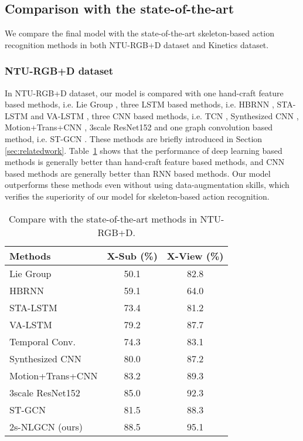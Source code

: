 \documentclass[10pt,twocolumn,letterpaper]{article}
\begin{document}
    
    \subsection{Comparison with the state-of-the-art}
    
    We compare the final model with the state-of-the-art skeleton-based action recognition methods in both NTU-RGB+D dataset and Kinetics dataset. 
    \subsubsection{NTU-RGB+D dataset}
    In NTU-RGB+D dataset, our model is compared with one hand-craft feature based methods, i.e. Lie Group \cite{vemulapalli_human_2014}, three LSTM based methods, i.e. HBRNN \cite{du_hierarchical_2015}, STA-LSTM \cite{song_end--end_2017} and VA-LSTM \cite{zhang_view_2017}, three CNN based methods, i.e. TCN \cite{kim_interpretable_2017}, Synthesized CNN \cite{liu_enhanced_2017}, Motion+Trans+CNN \cite{li_skeleton-based_2017}, 3scale ResNet152 \cite{li_skeleton_2017} and one graph convolution based method, i.e. ST-GCN \cite{yan_spatial_2018}. These methods are briefly introduced in Section \ref{sec:relatedwork}. Table~\ref{ntu-rgbd} shows that the performance of deep learning based methods is generally better than hand-craft feature based methods, and CNN based methods are generally better than RNN based methods. Our model outperforms these methods even without using data-augmentation skills, which verifies the superiority of our model for skeleton-based action recognition.
    
      \begin{table}[htb]
      \begin{center}
      \label{ntu-rgbd}
		\begin{tabular}{lcc}
			\hline
			Methods     &X-Sub (\%)& X-View (\%)    \\
            \hline
            Lie Group \cite{vemulapalli_human_2014} & 50.1 & 82.8 \\
			\hline
			HBRNN \cite{du_hierarchical_2015} & 59.1  &    64.0  \\
			STA-LSTM  \cite{song_end--end_2017}  & 73.4 &    81.2  \\
            VA-LSTM  \cite{zhang_view_2017}  & 79.2 &    87.7  \\
            \hline
			Temporal Conv.  \cite{kim_interpretable_2017}   & 74.3&    83.1      \\
            Synthesized CNN \cite{liu_enhanced_2017}   & 80.0 &      87.2  \\
            Motion+Trans+CNN & 83.2  &      89.3  \\
            3scale ResNet152 \cite{li_skeleton_2017}  & 85.0  &      92.3  \\
            \hline
            ST-GCN \cite{yan_spatial_2018} & 81.5  &      88.3  \\
            \hline
            2s-NLGCN (ours)&  88.5 & 95.1 \\
			\hline
		\end{tabular}
      \end{center}
      \caption{Compare with the state-of-the-art methods in NTU-RGB+D.}
	\end{table}
    
\end{document}
